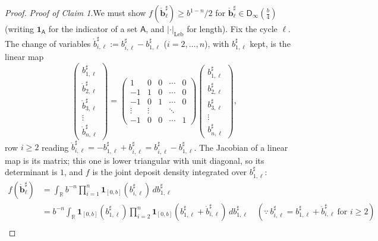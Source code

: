 \documentclass[11pt]{article}
\theoremstyle{definition}
\begin{document}
\begin{proof}
\noindent\emph{Proof of Claim 1.}\quad We must show $f(\mathring{\mathbf{b}}^{\sharp}_\ell)\geq b^{1-n}/2$ for $\mathring{\mathbf{b}}^{\sharp}_\ell\in\mathsf{D}_\infty(\tfrac{b}{4})$ (writing $\mathbf{1}_{\mathsf{A}}$ for the indicator of a set $\mathsf{A}$, and $|\cdot|_{\mathrm{Leb}}$ for length). Fix the cycle $\ell$. The change of variables $\mathring{b}^{\sharp}_{i,\ell} := b^{\sharp}_{i,\ell}-b^{\sharp}_{1,\ell}$ ($i = 2,\ldots,n$), with $b^{\sharp}_{1,\ell}$ kept, is the linear map
\[
  \begin{pmatrix} b^{\sharp}_{1,\ell} \\ \mathring{b}^{\sharp}_{2,\ell} \\ \mathring{b}^{\sharp}_{3,\ell} \\ \vdots \\ \mathring{b}^{\sharp}_{n,\ell} \end{pmatrix}
  =
  \begin{pmatrix}
    1 & 0 & 0 & \cdots & 0 \\
    -1 & 1 & 0 & \cdots & 0 \\
    -1 & 0 & 1 & \cdots & 0 \\
    \vdots & \vdots & & \ddots & \\
    -1 & 0 & 0 & \cdots & 1
  \end{pmatrix}
  \begin{pmatrix} b^{\sharp}_{1,\ell} \\ b^{\sharp}_{2,\ell} \\ b^{\sharp}_{3,\ell} \\ \vdots \\ b^{\sharp}_{n,\ell} \end{pmatrix},
\]
row $i\geq 2$ reading $\mathring{b}^{\sharp}_{i,\ell} = -b^{\sharp}_{1,\ell}+b^{\sharp}_{i,\ell} = b^{\sharp}_{i,\ell}-b^{\sharp}_{1,\ell}$. The Jacobian of a linear map is its matrix; this one is lower triangular with unit diagonal, so its determinant is $1$, and $f$ is the joint deposit density integrated over $b^{\sharp}_{1,\ell}$:
\[
\begin{aligned}
  f(\mathring{\mathbf{b}}^{\sharp}_\ell)
  &= \int_{\mathbb{R}} b^{-n}\prod_{i=1}^{n}\mathbf{1}_{[0,b]}(b^{\sharp}_{i,\ell})\,db^{\sharp}_{1,\ell} \\
  &= b^{-n}\int_{\mathbb{R}} \mathbf{1}_{[0,b]}(b^{\sharp}_{1,\ell})\prod_{i=2}^{n}\mathbf{1}_{[0,b]}(b^{\sharp}_{1,\ell}+\mathring{b}^{\sharp}_{i,\ell})\,db^{\sharp}_{1,\ell}
     \quad(\because\ b^{\sharp}_{i,\ell} = b^{\sharp}_{1,\ell}+\mathring{b}^{\sharp}_{i,\ell}\ \text{for } i\geq 2) \\

\end{aligned}\]
\end{proof}
\end{document}
